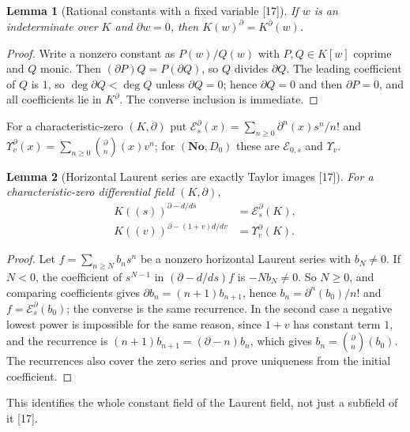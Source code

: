 \documentclass[11pt,oneside]{article}
\numberwithin{equation}{section}
\newtheorem{lemma}[lemma]{Lemma}
\theoremstyle{definition}
\theoremstyle{remark}
\newcommand{\No}{\mathbf{No}}
\newcommand{\EE}{\mathcal E}
\newcommand{\src}[1]{\textup{\textsf{\small[#1]}}}
\begin{document}
\begin{lemma}[Rational constants with a fixed variable \src{17}]\label{opa:of:lem:fixedvariable}
If $w$ is an indeterminate over $K$ and $\partial w=0$, then $K(w)^\partial=K^\partial(w)$.
\end{lemma}
\begin{proof}
Write a nonzero constant as $P(w)/Q(w)$ with $P,Q\in K[w]$ coprime and $Q$ monic. Then $(\partial P)Q=P(\partial Q)$, so $Q$
divides $\partial Q$. The leading coefficient of $Q$ is $1$, so $\deg\partial Q<\deg Q$ unless $\partial Q=0$; hence $\partial Q=0$ and
then $\partial P=0$, and all coefficients lie in $K^\partial$. The converse inclusion is immediate.
\end{proof}

For a characteristic-zero $(K,\partial)$ put
$\EE^\partial_s(x)=\sum_{n\ge0}\partial^n(x)s^n/n!$ and $\Upsilon^\partial_v(x)=\sum_{n\ge0}\binom\partial n(x)v^n$; for $(\No,D_0)$ these
are $\EE_{0,s}$ and $\Upsilon_v$.

\begin{lemma}[Horizontal Laurent series are exactly Taylor images \src{17}]\label{opa:of:lem:horizontal}
For a characteristic-zero differential field $(K,\partial)$,
\begin{align}
 K((s))^{\partial-d/ds}&=\EE^\partial_s(K),\label{opa:of:eq:horizontaladd}\\
 K((v))^{\partial-(1+v)d/dv}&=\Upsilon^\partial_v(K).\label{opa:of:eq:horizontalmult}
\end{align}
\end{lemma}
\begin{proof}
Let $f=\sum_{n\ge N}b_ns^n$ be a nonzero horizontal Laurent series with $b_N\ne0$. If $N<0$, the coefficient of $s^{N-1}$ in
$(\partial-d/ds)f$ is $-Nb_N\ne0$. So $N\ge0$, and comparing coefficients gives $\partial b_n=(n+1)b_{n+1}$, hence
$b_n=\partial^n(b_0)/n!$ and $f=\EE^\partial_s(b_0)$; the converse is the same recurrence. In the second case a negative lowest
power is impossible for the same reason, since $1+v$ has constant term $1$, and the recurrence is $(n+1)b_{n+1}=(\partial-n)b_n$,
which gives $b_n=\binom\partial n(b_0)$. The recurrences also cover the zero series and prove uniqueness from the initial
coefficient.
\end{proof}

This identifies the whole constant field of the Laurent field, not just a subfield of it \src{17}.
\end{document}
